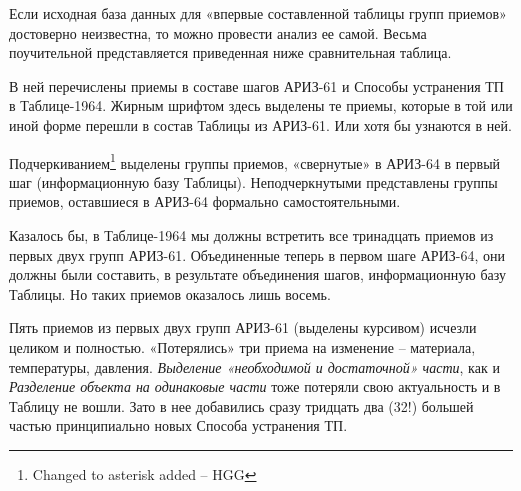 \documentclass[11pt,a4paper]{article}
\begin{document}
Если исходная база данных для «впервые составленной таблицы групп приемов»
достоверно неизвестна, то можно провести анализ ее самой. Весьма поучительной
представляется приведенная ниже сравнительная таблица.

В ней перечислены приемы в составе шагов АРИЗ-61 и Способы устранения ТП в
Таблице-1964. Жирным шрифтом здесь выделены те приемы, которые в той или иной
форме перешли в состав Таблицы из АРИЗ-61. Или хотя бы узнаются в ней.

Подчеркиванием\footnote{Changed to asterisk added -- HGG} выделены группы
приемов, «свернутые» в АРИЗ-64 в первый шаг (информационную базу Таблицы).
Неподчеркнутыми представлены группы приемов, оставшиеся в АРИЗ-64 формально
самостоятельными.

Казалось бы, в Таблице-1964 мы должны встретить все тринадцать приемов из
первых двух групп АРИЗ-61. Объединенные теперь в первом шаге АРИЗ-64, они
должны были составить, в результате объединения шагов, информационную базу
Таблицы. Но таких приемов оказалось лишь восемь.

Пять приемов из первых двух групп АРИЗ-61 (выделены курсивом) исчезли целиком
и полностью. «Потерялись» три приема на изменение -- материала, температуры,
давления. \emph{Выделение «необходимой и достаточной» части}, как и
\emph{Разделение объекта на одинаковые части} тоже потеряли свою актуальность
и в Таблицу не вошли.  Зато в нее добавились сразу тридцать два (32!) большей
частью принципиально новых Способа устранения ТП.
\end{document}
